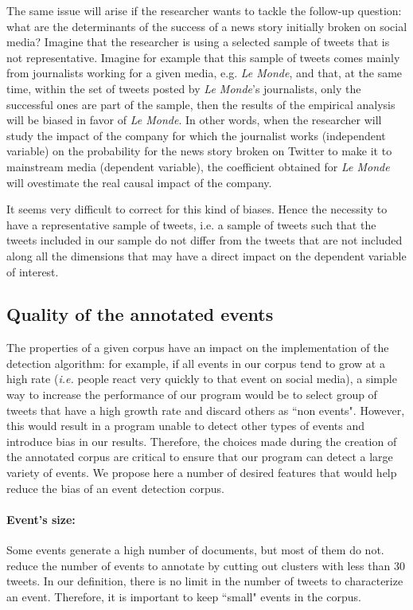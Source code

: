 The same issue will arise if the researcher wants to tackle the follow-up question: what are the determinants of the success of a news story initially broken on social media? Imagine that the researcher is using a selected sample of tweets that is not representative. Imagine for example that this sample of tweets comes mainly from journalists working for a given media, e.g. \textit{Le Monde}, and that, at the same time, within the set of tweets posted by \textit{Le Monde}’s journalists, only the successful ones are part of the sample, then the results of the empirical analysis will be biased in favor of \textit{Le Monde}. In other words, when the researcher will study the impact of the company for which the journalist works (independent variable) on the probability for the news story broken on Twitter to make it to mainstream media (dependent variable), the coefficient obtained for \textit{Le Monde} will ovestimate the real causal impact of the company.


It seems very difficult to correct for this kind of biases. Hence the necessity to have a representative sample of tweets, i.e. a sample of tweets such that the tweets included in our sample do not differ from the tweets that are not included along all the dimensions that may have a direct impact on the dependent variable of interest.

\subsection{Quality of the annotated events}

The properties of a given corpus have an impact on the implementation of the detection algorithm: for example, if all events in our corpus tend to grow at a high rate (\textit{i.e.} people react very quickly to that event on social media), a simple way to increase the performance of our program would be to select group of tweets that have a high growth rate and discard others as ``non events". However, this would result in a program unable to detect other types of events and introduce bias in our results. Therefore, the choices made during the creation of the annotated corpus are critical to ensure that our program can detect a large variety of events. We propose here a number of desired features that would help reduce the bias of an event detection corpus.
	
		
		\paragraph{\textbf{Event's size:}}
		Some events generate a high number of documents, but most of them do not. \citet{mcminn_building_2013} reduce the number of events to annotate by cutting out clusters with less than 30 tweets. In our definition, there is no limit in the number of tweets to characterize an event. Therefore, it is important to keep ``small" events in the corpus.
		
